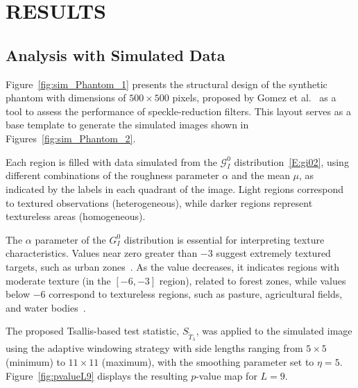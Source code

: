 \documentclass[
  lettersize  journal,
]{IEEEtran}%
\begin{document}
\section{RESULTS}\label{sec:app}

\subsection{Analysis with Simulated Data}\label{sec-sim2}

Figure~\ref{fig:sim_Phantom_1} presents the structural design of the
synthetic phantom with dimensions of \(500\times500\) pixels, proposed
by Gomez et al.~ as a tool to assess
the performance of speckle-reduction filters. This layout serves as a
base template to generate the simulated images shown in
Figures~\ref{fig:sim_Phantom_2}.

Each region is filled with data simulated from the \(\mathcal{G}^0_I\)
distribution~\eqref{E:gi02}, using different combinations of the
roughness parameter \(\alpha\) and the mean \(\mu\), as indicated by the
labels in each quadrant of the image. Light regions correspond to
textured observations (heterogeneous), while darker regions represent
textureless areas (homogeneous).

The \(\alpha\) parameter of the \(G_I^0\) distribution is essential for
interpreting texture characteristics. Values near zero greater than
\(-3\) suggest extremely textured targets, such as urban
zones~. As the value decreases, it
indicates regions with moderate texture (in the \(\left[-6,-3\right]\)
region), related to forest zones, while values below \(-6\) correspond
to textureless regions, such as pasture, agricultural fields, and water
bodies~.

The proposed Tsallis-based test statistic,
\(S_{\widetilde{T}_\lambda}\), was applied to the simulated image using
the adaptive windowing strategy with side lengths ranging from
\(5\times 5\) (minimum) to \(11\times 11\) (maximum), with the smoothing
parameter set to \(\eta = 5\). Figure~\ref{fig:pvalueL9} displays the
resulting \(p\)-value map for \(L=9\).
\end{document}

